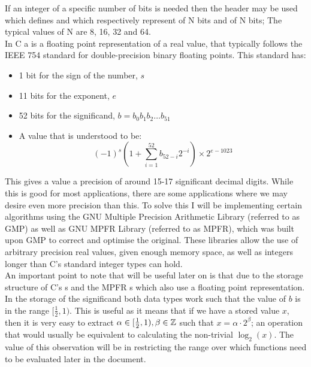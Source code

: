 If an integer of a specific number of bits is needed then the header  may be used which defines  and  which respectively represent  of N bits and  of N bits; The typical values of N are 8, 16, 32 and 64.\\

In C a  is a floating point representation of a real value, that typically follows the IEEE 754 standard\cite{MAN_ieee754} for double-precision binary floating points. This standard has:
\begin{itemize}
\item 1 bit for the sign of the number, \(s\)
\item 11 bits for the exponent, \(e\)
\item 52 bits for the significand, \(b = b_0b_1b_2\dots b_{51}\)
\item A value that is understood to be:
	\[(-1)^s\left(1 + \sum_{i=1}^{52}b_{52-i}2^{-i}\right) \times 2^{e-1023
}\]
\end{itemize}

This gives a  value a precision of around 15-17 significant decimal digits. While this is good for most applications, there are some applications where we may desire even more precision than this. To solve this I will be implementing certain algorithms using the GNU Multiple Precision Arithmetic Library\cite{ONL_gmp} (referred to as GMP) as well as GNU MPFR Library\cite{ONL_mpfr} (referred to as MPFR), which was built upon GMP to correct and optimise the original. These libraries allow the use of arbitrary precision real values, given enough memory space, as well as integers longer than C's standard integer types can hold.\\

An important point to note that will be useful later on is that due to the storage structure of C's s and the MPFR s which also use a floating point representation. In the storage of the significand both data types work such that the value of \(b\) is in the range \([\frac{1}{2}, 1)\). This is useful as it means that if we have a stored value \(x\), then it is very easy to extract \(\alpha\in[\frac{1}{2}, 1), \beta \in \mathbb{Z}\) such that \(x = \alpha\cdot2^\beta\); an operation that would usually be equivalent to calculating the non-trivial \(\log_2(x)\). The value of this observation will be in restricting the range over which functions need to be evaluated later in the document.\\

